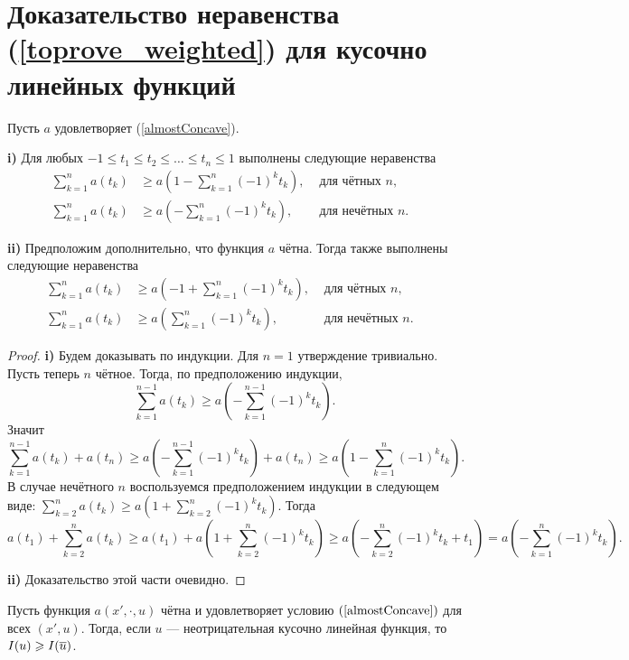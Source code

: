 \section{Доказательство неравенства (\ref{toprove_weighted}) для кусочно ли\-ней\-ных функций}

\begin{lm}
\label{weightSum}
Пусть $a$ удовлетворяет (\ref{almostConcave}).

\textbf{\textup{i)}}
Для любых $-1 \le t_1 \le t_2 \le \ldots \le t_n \le 1$ выполнены следующие неравенства
\begin{align*}
\sum_{k = 1}^n a(t_k) & \ge a( 1 - \sum_{k = 1}^n (-1)^k t_k), & \text{ для чётных $n$}, & \\
\sum_{k = 1}^n a(t_k) & \ge a(- \sum_{k = 1}^n (-1)^k t_k), & \text{ для нечётных $n$}. &
\end{align*}

\textbf{\textup{ii)}}
Предположим дополнительно, что функция $a$ чётна.
Тогда также выполнены следующие неравенства
\begin{align*}
\sum_{k = 1}^n a(t_k) & \ge a(-1 + \sum_{k = 1}^n (-1)^k t_k), & \text{ для чётных $n$}, & \\
\sum_{k = 1}^n a(t_k) & \ge a(\sum_{k = 1}^n (-1)^k t_k), & \text{ для нечётных $n$}. &
\end{align*}
\end{lm}

\begin{proof}
\textbf{\textup{i)}}
Будем доказывать по индукции.
Для $n = 1$ утверждение тривиально.
Пусть теперь $n$ чётное.
Тогда, по предположению индукции,
$$\sum_{k=1}^{n - 1} a(t_k) \ge a( -\sum_{k = 1}^{n - 1} (-1)^k t_k ).$$
Значит
$$\sum_{k = 1}^{n - 1} a( t_k ) + a( t_n ) \ge a( -\sum_{k = 1}^{n - 1} (-1)^k t_k ) + a( t_n ) \ge
a( 1 - \sum_{k = 1}^{n} (-1)^k t_k ).$$
В случае нечётного $n$ воспользуемся предположением индукции в следующем виде:
$\sum_{k=2}^n a(t_k) \ge a( 1 + \sum_{k = 2}^n (-1)^k t_k )$.
Тогда
$$
a( t_1 ) + \sum_{k = 2}^n a( t_k ) \ge a( t_1 ) + a( 1 + \sum_{k = 2}^{n} (-1)^k t_k ) \ge
a( -\sum_{k = 2}^{n} (-1)^k t_k + t_1 ) = a( -\sum_{k = 1}^{n} (-1)^k t_k ).
$$

\textbf{\textup{ii)}} Доказательство этой части очевидно.
\end{proof}

\begin{lm}
\label{weighted_linear_lm}
Пусть функция $a(x', \cdot, u)$ чётна и удовлетворяет условию $(\ref{almostConcave})$ для всех $(x', u)$.
Тогда, если $u$ --- неотрицательная кусочно линейная функция, то $I( u ) \ge I( \mon{u} )$.
\end{lm}

